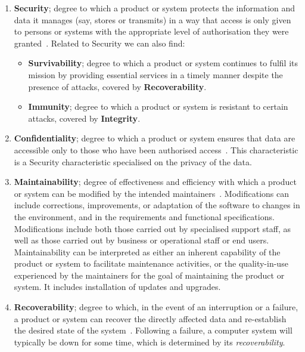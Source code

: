 \begin{enumerate}
    \item \textbf{Security}; degree to which a product or system protects the information and data it manages (say, stores or transmits) in a way that access is only given to persons or systems with the appropriate level of authorisation they were granted~\cite{iso_25010_2011_2017}. Related to Security we can also find:
    \begin{itemize}
        \item \textbf{Survivability}; degree to which a product or system continues to fulfil its mission by providing essential services in a timely manner despite the presence of attacks, covered by \textbf{Recoverability}.
        \item \textbf{Immunity}; degree to which a product or system is resistant to certain attacks, covered by \textbf{Integrity}.
    \end{itemize}
    
    \item \textbf{Confidentiality}; degree to which a product or system ensures that data are accessible only to those who have been authorised access~\cite{iso_25010_2011_2017}. This characteristic is a Security characteristic specialised on the privacy of the data.

    \item \textbf{Maintainability}; degree of effectiveness and efficiency with which a product or system can be modified by the intended maintainers~\cite{iso_25010_2011_2017}. Modifications can include corrections, improvements, or adaptation of the software to changes in the environment, and in the requirements and functional specifications. Modifications include both those carried out by specialised support staff, as well as those carried out by business or operational staff or end users. Maintainability can be interpreted as either an inherent capability of the product or system to facilitate maintenance activities, or the quality-in-use experienced by the maintainers for the goal of maintaining the product or system. It includes installation of updates and upgrades. 

    \item \textbf{Recoverability}; degree to which, in the event of an interruption or a failure, a product or system can recover the directly affected data and re-establish the desired state of the system~\cite{iso_25010_2011_2017}. Following a failure, a computer system will typically be down for some time, which is determined by its \textit{recoverability}.


\end{enumerate}
